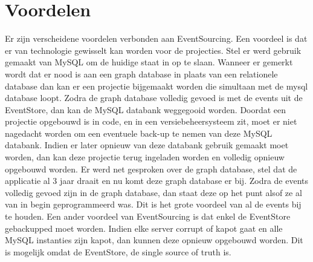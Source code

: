 
\section{Voordelen}
\label{sec:voordelen}

Er zijn verscheidene voordelen verbonden aan EventSourcing. Een voordeel is dat er van technologie gewisselt kan worden voor de projecties. Stel er werd gebruik gemaakt van MySQL om de huidige staat in op te slaan. Wanneer er gemerkt wordt dat er nood is aan een graph database in plaats van een relationele database dan kan er een projectie bijgemaakt worden die simultaan met de mysql database loopt. Zodra de graph database volledig gevoed is met de events uit de EventStore, dan kan de MySQL databank weggegooid worden. Doordat een projectie opgebouwd is in code, en in een versiebeheersysteem zit, moet er niet nagedacht worden om een eventuele back-up te nemen van deze MySQL databank. Indien er later opnieuw van deze databank gebruik gemaakt moet worden, dan kan deze projectie terug ingeladen worden en volledig opnieuw opgebouwd worden.
Er werd net gesproken over de graph database, stel dat de applicatie al 3 jaar draait en nu komt deze graph database er bij. Zodra de events volledig gevoed zijn in de graph database, dan staat deze op het punt alsof ze al van in begin geprogrammeerd was. Dit is het grote voordeel van al de events bij te houden.
Een ander voordeel van EventSourcing is dat enkel de EventStore gebackupped moet worden. Indien elke server corrupt of kapot gaat en alle MySQL instanties zijn kapot, dan kunnen deze opnieuw opgebouwd worden. Dit is mogelijk omdat de EventStore, de single source of truth is.